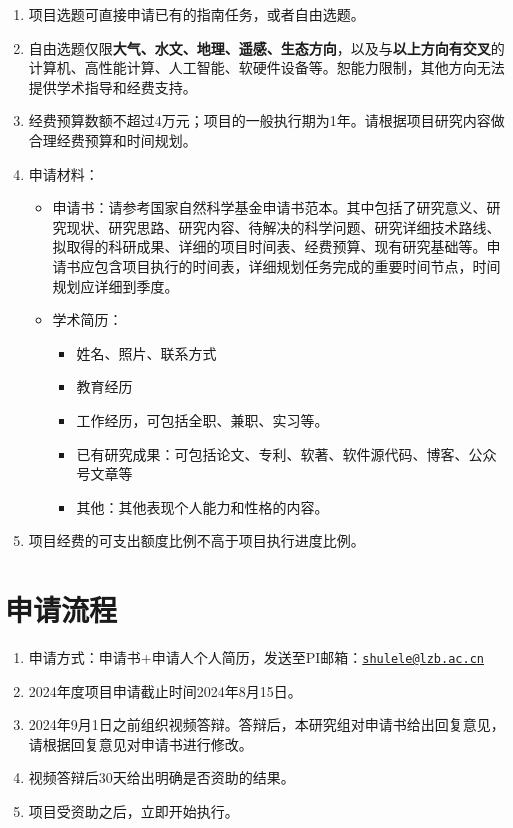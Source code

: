\documentclass[
]{book}
\providecommand{\tightlist}{%
  \setlength{\itemsep}{0pt}\setlength{\parskip}{0pt}}
\begin{document}
\begin{enumerate}
\def\labelenumi{\arabic{enumi}.}
\tightlist
\item
  项目选题可直接申请已有的指南任务，或者自由选题。
\item
  自由选题仅限\textbf{大气、水文、地理、遥感、生态方向}，以及与\textbf{以上方向有交叉}的计算机、高性能计算、人工智能、软硬件设备等。恕能力限制，其他方向无法提供学术指导和经费支持。
\item
  经费预算数额不超过4万元；项目的一般执行期为1年。请根据项目研究内容做合理经费预算和时间规划。
\item
  申请材料：

  \begin{itemize}
  \tightlist
  \item
    申请书：请参考国家自然科学基金申请书范本。其中包括了研究意义、研究现状、研究思路、研究内容、待解决的科学问题、研究详细技术路线、拟取得的科研成果、详细的项目时间表、经费预算、现有研究基础等。申请书应包含项目执行的时间表，详细规划任务完成的重要时间节点，时间规划应详细到季度。
  \item
    学术简历：

    \begin{itemize}
    \tightlist
    \item
      姓名、照片、联系方式
    \item
      教育经历
    \item
      工作经历，可包括全职、兼职、实习等。
    \item
      已有研究成果：可包括论文、专利、软著、软件源代码、博客、公众号文章等
    \item
      其他：其他表现个人能力和性格的内容。
    \end{itemize}
  \end{itemize}
\item
  项目经费的可支出额度比例不高于项目执行进度比例。
\end{enumerate}

\hypertarget{ux7533ux8bf7ux6d41ux7a0b}{%
\section{申请流程}\label{ux7533ux8bf7ux6d41ux7a0b}}

\begin{enumerate}
\def\labelenumi{\arabic{enumi}.}
\tightlist
\item
  申请方式：申请书+申请人个人简历，发送至PI邮箱：\href{mailto:shulele@lzb.ac.cn}{\nolinkurl{shulele@lzb.ac.cn}}
\item
  2024年度项目申请截止时间2024年8月15日。
\item
  2024年9月1日之前组织视频答辩。答辩后，本研究组对申请书给出回复意见，请根据回复意见对申请书进行修改。
\item
  视频答辩后30天给出明确是否资助的结果。
\item
  项目受资助之后，立即开始执行。
\end{enumerate}
\end{document}
